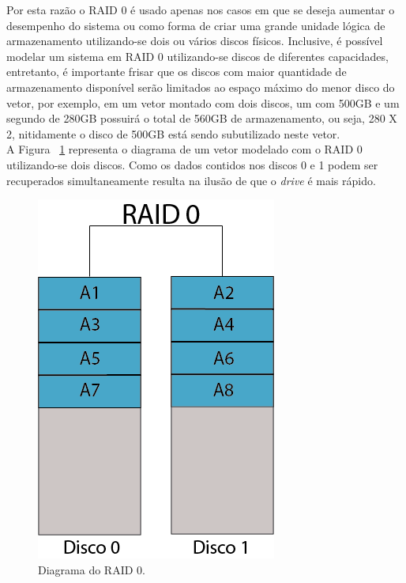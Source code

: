 Por esta razão o RAID 0 é usado apenas nos casos em que se deseja aumentar o desempenho do sistema ou como forma de criar uma grande unidade lógica de armazenamento utilizando-se dois ou vários discos físicos. Inclusive, é possível modelar um sistema em RAID 0 utilizando-se discos de diferentes capacidades, entretanto, é importante frisar que os discos com maior quantidade de armazenamento disponível serão limitados ao espaço máximo do menor disco do vetor, por exemplo, em um vetor montado com dois discos, um com 500GB e um segundo de 280GB possuirá o total de 560GB de armazenamento, ou seja, 280 X 2, nitidamente o disco de 500GB está sendo subutilizado neste vetor. 
\\

A Figura ~\ref{fig:raid0} representa o diagrama de um vetor modelado com o RAID 0 utilizando-se dois discos. Como os dados contidos nos discos 0 e 1 podem ser recuperados simultaneamente resulta na ilusão de que o \textit{drive} é mais rápido.\\

\begin{figure}[htb]
	\begin{center}
		
		\includegraphics[clip,scale=0.5]{images/RAID_0.png}
		\caption{Diagrama do RAID 0. }
		\label{fig:raid0}
	\end{center}
\end{figure} 


